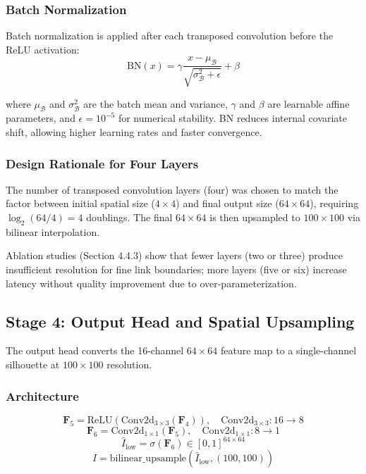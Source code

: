 \documentclass[12pt,a4paper,oneside]{report}
\begin{document}
\subsubsection{Batch Normalization}

Batch normalization is applied after each transposed convolution before the ReLU activation:
\begin{equation}
\text{BN}(x) = \gamma \frac{x - \mu_{\mathcal{B}}}{\sqrt{\sigma_{\mathcal{B}}^2 + \epsilon}} + \beta
\end{equation}

where $\mu_{\mathcal{B}}$ and $\sigma_{\mathcal{B}}^2$ are the batch mean and variance, $\gamma$ and $\beta$ are learnable affine parameters, and $\epsilon = 10^{-5}$ for numerical stability. BN reduces internal covariate shift, allowing higher learning rates and faster convergence.

\subsubsection{Design Rationale for Four Layers}

The number of transposed convolution layers (four) was chosen to match the factor between initial spatial size ($4 \times 4$) and final output size ($64 \times 64$), requiring $\log_2(64/4) = 4$ doublings. The final $64 \times 64$ is then upsampled to $100 \times 100$ via bilinear interpolation.

Ablation studies (Section 4.4.3) show that fewer layers (two or three) produce insufficient resolution for fine link boundaries; more layers (five or six) increase latency without quality improvement due to over-parameterization.

\subsection{Stage 4: Output Head and Spatial Upsampling}

The output head converts the 16-channel $64 \times 64$ feature map to a single-channel silhouette at $100 \times 100$ resolution.

\subsubsection{Architecture}

\begin{equation}
\mathbf{F}_5 = \text{ReLU}(\text{Conv2d}_{3\times3}(\mathbf{F}_4)), \quad \text{Conv2d}_{3\times3}: 16 \rightarrow 8
\end{equation}
\begin{equation}
\mathbf{F}_6 = \text{Conv2d}_{1\times1}(\mathbf{F}_5), \quad \text{Conv2d}_{1\times1}: 8 \rightarrow 1
\end{equation}
\begin{equation}
\hat{I}_{\text{low}} = \sigma(\mathbf{F}_6) \in [0, 1]^{64 \times 64}
\end{equation}
\begin{equation}
\hat{I} = \text{bilinear\_upsample}(\hat{I}_{\text{low}}, (100, 100))
\end{equation}
\end{document}
